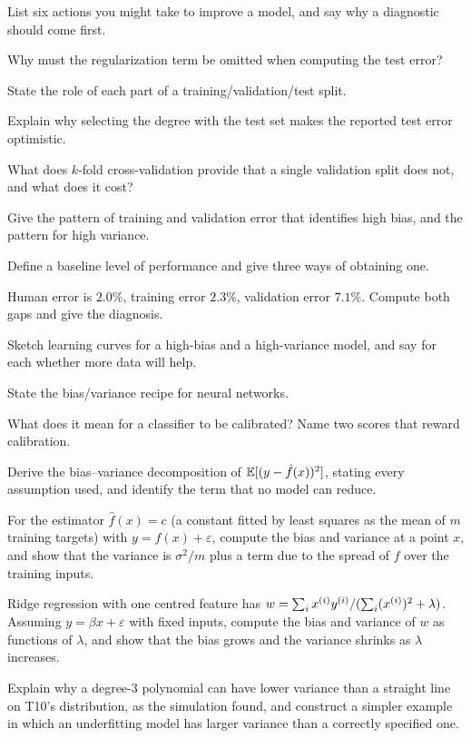
\sq List six actions you might take to improve a model, and say why a diagnostic
should come first.

\sq Why must the regularization term be omitted when computing the test error?

\sq State the role of each part of a training/validation/test split.

\sq Explain why selecting the degree with the test set makes the reported test
error optimistic.

\sq What does $k$-fold cross-validation provide that a single validation split
does not, and what does it cost?

\sq Give the pattern of training and validation error that identifies high bias,
and the pattern for high variance.

\sq Define a baseline level of performance and give three ways of obtaining one.

\sq Human error is $2.0\%$, training error $2.3\%$, validation error $7.1\%$.
Compute both gaps and give the diagnosis.

\sq Sketch learning curves for a high-bias and a high-variance model, and say for
each whether more data will help.

\sq State the bias/variance recipe for neural networks.

\sq What does it mean for a classifier to be calibrated? Name two scores that
reward calibration.


\ap Derive the bias--variance decomposition of $\mathbb{E}[(y - \hat f(x))^2]$,
stating every assumption used, and identify the term that no model can reduce.

\ap For the estimator $\hat f(x) = c$ (a constant fitted by least squares as the
mean of $m$ training targets) with $y = f(x) + \varepsilon$, compute the bias and
variance at a point $x$, and show that the variance is $\sigma^2/m$ plus a term
due to the spread of $f$ over the training inputs.

\ap Ridge regression with one centred feature has
$w = \sum_ix^{(i)}y^{(i)}/(\sum_i(x^{(i)})^2 + \lambda)$. Assuming
$y = \beta x + \varepsilon$ with fixed inputs, compute the bias and variance of
$w$ as functions of $\lambda$, and show that the bias grows and the variance
shrinks as $\lambda$ increases.

\ap Explain why a degree-$3$ polynomial can have lower variance than a straight
line on T10's distribution, as the simulation found, and construct a simpler
example in which an underfitting model has larger variance than a correctly
specified one.

